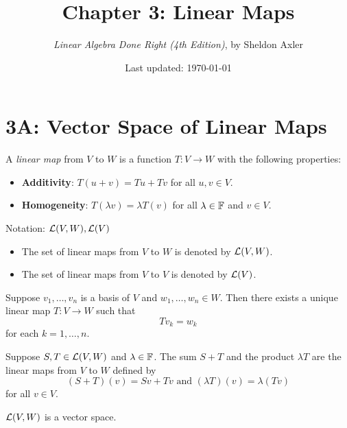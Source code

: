 \documentclass{extarticle}
\title{\vspace{-2em}Chapter 3: Linear Maps}
\author{\emph{Linear Algebra Done Right (4th Edition)}, by Sheldon Axler}
\date{Last updated: \today}
\begin{document}
\maketitle 
\tableofcontents
\newpage 

\section*{3A: Vector Space of Linear Maps}

\begin{definition}
    A \emph{linear map} from \(V\) to \(W\) is a function \(T \colon V \to W\) with the following 
    properties:
    \begin{itemize}
        \item \textbf{Additivity}: \(T(u + v) = Tu + Tv\) for all \(u, v \in V\).
        \item \textbf{Homogeneity}: \(T(\lambda v) = \lambda T(v)\) for all \(\lambda \in \mathbb{F}\) and \(v \in V\).
    \end{itemize}
\end{definition}

Notation: \(\mathcal{L}(V, W), \mathcal{L}(V)\)

\begin{itemize}
    \item The set of linear maps from \(V\) to \(W\) is denoted by \(\mathcal{L} (V, W)\).
    \item The set of linear maps from \(V\) to \(V\) is denoted by \(\mathcal{L} (V)\). 
\end{itemize}

\begin{lemma}
    Suppose \(v_1, \ldots, v_n\) is a basis of \(V\) and \(w_1, \ldots, w_n \in W\). Then 
    there exists a unique linear map \(T \colon V \to W\) such that 
    \[T v_k = w_k\]
    for each \(k = 1, \ldots, n\).
\end{lemma}

\begin{definition}
    Suppose \(S, T \in \mathcal{L}(V, W)\) and \(\lambda \in \mathbb{F}\). The sum \(S+ T\) and the 
    product \(\lambda T\) are the linear maps from \(V\) to \(W\) defined by 
    \[(S+T)(v) = Sv + Tv \text{  and  } (\lambda T)(v) = \lambda (Tv)\]
    for all \(v \in V\).
\end{definition}

\begin{remark}
    \(\mathcal{L}(V, W)\) is a vector space.
\end{remark}
\end{document}
